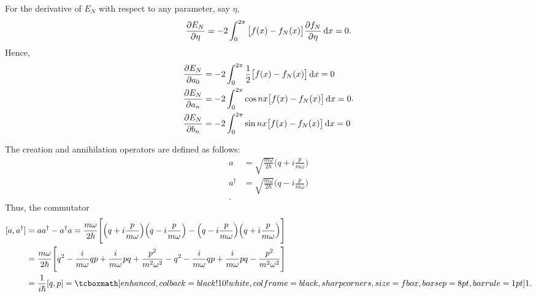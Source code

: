 For the derivative of $E_{N}$ with respect to any parameter, say $\eta$, 
\begin{eqnarray}
    \label{eq:deriv-EN-param}
    \pdv{E_{N}}{\eta} = -2\int_{0}^{2\pi} \big[ f(x) - f_{N}(x) \big] \pdv{f_{N}}{\eta} \dd{x} = 0
.\end{eqnarray}
Hence,
\begin{eqnarray}
    \label{eq:deriv-a0}
    \begin{aligned}
        \pdv{E_{N}}{a_0} &= -2\int_{0}^{2\pi} \frac{1}{2}\big[f(x) - f_{N}(x) \big] \dd{x} = 0 \\
        \pdv{E_{N}}{a_n} &= -2\int_{0}^{2\pi} \cos{nx}\big[f(x) - f_{N}(x) \big] \dd{x} = 0 \\
        \pdv{E_{N}}{b_n} &= -2\int_{0}^{2\pi} \sin{nx}\big[f(x) - f_{N}(x) \big] \dd{x} = 0 \\
    \end{aligned}
.\end{eqnarray}




The creation and annihilation operators are defined as follows:
\begin{align}
    \label{eq:creation-annihilation-def}
    a &= \sqrt{\frac{m\omega}{2\hbar}}\Big( q + i \frac{p}{m\omega} \Big) \\
    a^{\dagger} &= \sqrt{\frac{m\omega}{2\hbar}}\Big( q - i \frac{p}{m\omega} \Big) \\
.\end{align}
Thus, the commutator
\begin{align}
    \label{eq:commutator}
    [a,a^{\dagger}] &= a a^{\dagger} - a^{\dagger} a = \frac{m\omega}{2\hbar} \Bigg[ \Big( q + i \frac{p}{m\omega} \Big) \Big( q - i \frac{p}{m\omega} \Big)  - \Big( q - i \frac{p}{m \omega} \Big) \Big( q + i \frac{p}{m \omega} \Big) \Bigg] \notag \\
                    &= \frac{m\omega}{2\hbar} \Bigg[ q^2 - \frac{i}{m \omega} qp + \frac{i}{m \omega} pq + \frac{p^2}{m^2 \omega^2} - q^2 - \frac{i}{m \omega} qp + \frac{i}{m \omega} pq - \frac{p^2}{m^2 \omega^2} \Bigg] \notag \\
                    &= \frac{1}{i \hbar} [q,p] = \eqbox{1}
.\end{align}



